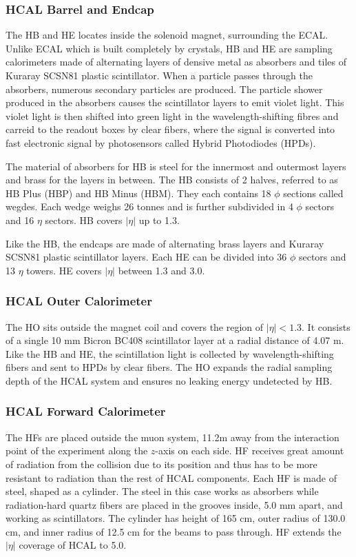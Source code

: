 \subsubsection{HCAL Barrel and Endcap}
The HB and HE locates inside the solenoid magnet, surrounding the ECAL. Unlike ECAL which is built completely by crystals, HB and HE are sampling calorimeters made of alternating layers of densive metal as absorbers and tiles of Kuraray SCSN81 plastic scintillator. When a particle passes through the absorbers, numerous secondary particles are produced. The particle shower produced in the absorbers causes the scintillator layers to emit violet light. This violet light is then shifted into green light in the wavelength-shifting fibres and carreid to the readout boxes by clear fibers, where the signal is converted into fast electronic signal by photosensors called Hybrid Photodiodes (HPDs).

\vspace{0.3cm}
The material of absorbers for HB is steel for the innermost and outermost layers and brass for the layers in between. The HB consists of 2 halves, referred to as HB Plus (HBP) and HB Minus (HBM). They each contains 18 $\phi$ sections called wegdes. Each wedge weighs 26 tonnes and is further subdivided in 4 $\phi$ sectors and 16 $\eta$ sectors. HB covers $|\eta|$ up to 1.3.

\vspace{0.3cm}
Like the HB, the endcaps are made of alternating brass layers and Kuraray SCSN81 plastic scintillator layers. Each HE can be divided into 36 $\phi$ sectors and 13 $\eta$ towers. HE covers $|\eta|$ between 1.3 and 3.0.

\subsubsection{HCAL Outer Calorimeter}
The HO sits outside the magnet coil and covers the region of $|\eta|<1.3$. It consists of a single 10 mm Bicron BC408 scintillator layer at a radial distance of 4.07 m. Like the HB and HE, the scintillation light is collected by wavelength-shifting fibers and sent to HPDs by clear fibers. The HO expands the radial sampling depth of the HCAL system and ensures no leaking energy undetected by HB.

\subsubsection{HCAL Forward Calorimeter}
The HFs are placed outside the muon system, 11.2m away from the interaction point of the experiment along the $z$-axis on each side. HF receives great amount of radiation from the collision due to its position and thus has to be more resistant to radiation than the rest of HCAL components. Each HF is made of steel, shaped as a cylinder. The steel in this case works as absorbers while radiation-hard quartz fibers are placed in the grooves inside, 5.0 mm apart, and working as scintillators. The cylinder has height of 165 cm, outer radius of 130.0 cm, and inner radius of 12.5 cm for the beams to pass through. HF extends the $|\eta|$ coverage of HCAL to 5.0.

